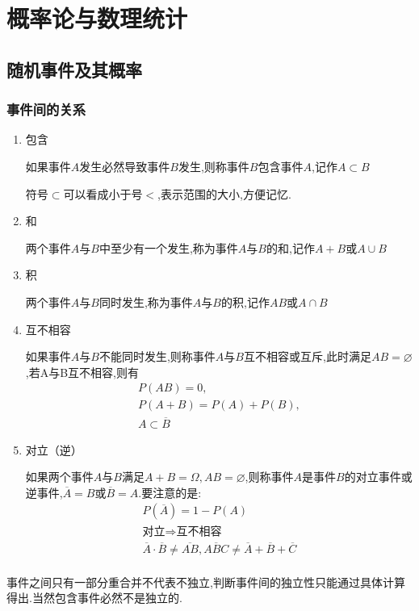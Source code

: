 
\section{概率论与数理统计}
\subsection{随机事件及其概率}
\subsubsection{事件间的关系}
\begin{enumerate}
    \item 包含
    
    如果事件$A$发生必然导致事件$B$发生,则称事件$B$包含事件$A$,记作$A\subset B$

    符号$\subset $可以看成小于号$<$,表示范围的大小,方便记忆.
    \item 和
    
    两个事件$A$与$B$中至少有一个发生,称为事件$A$与$B$的和,记作$A+B$或$A\cup B$
    \item 积
    
    两个事件$A$与$B$同时发生,称为事件$A$与$B$的积,记作$AB$或$A\cap B$
    \item 互不相容
    
    如果事件$A$与$B$不能同时发生,则称事件$A$与$B$互不相容或互斥,此时满足$AB=\varnothing $,若A与B互不相容,则有\begin{gather*}
        P(AB)=0,\\
        P(A+B)=P(A)+P(B),\\
        A\subset \overline{B}
    \end{gather*}
    \item 对立（逆）
    
    如果两个事件$A$与$B$满足$A+B=\varOmega,AB=\varnothing $,则称事件$A$是事件$B$的对立事件或逆事件,$\overline{A}=B$或$\overline{B}=A$.要注意的是:
    \begin{gather*}
        P(\overline{A})=1-P(A)\\
        \text{对立}\Rightarrow \text{互不相容}\\
        \overline{A}\cdot \overline{B}\neq \overline{AB},\overline{ABC}\neq \overline{A}+\overline{B}+\overline{C}\\
    \end{gather*}
\end{enumerate}

事件之间只有一部分重合并不代表不独立,判断事件间的独立性只能通过具体计算得出.当然包含事件必然不是独立的.
